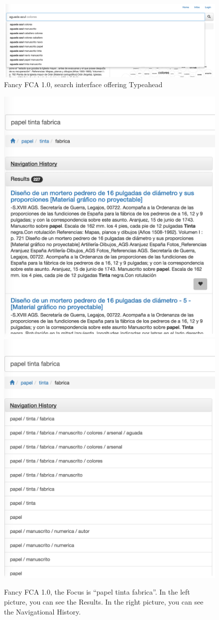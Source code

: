 \documentclass[11pt]{report}
\begin{document}
\begin{figure}[!ht]
	\centering
	\includegraphics[width=\linewidth]{images/fancy2}
\caption{Fancy FCA 1.0, search interface offering Typeahead}
\label{figure:fancy2}
\end{figure}

\begin{figure}[!ht]
\includegraphics[width=.48\linewidth]{images/fancy4}\hfill
\includegraphics[width=.48\linewidth]{images/fancy3}
\caption{Fancy FCA 1.0, the Focus is ``papel tinta fabrica''. In the left picture, you can see the Results. In the right picture, you can see the Navigational History.}
\label{figure:fancy3}
\end{figure}
\end{document}
